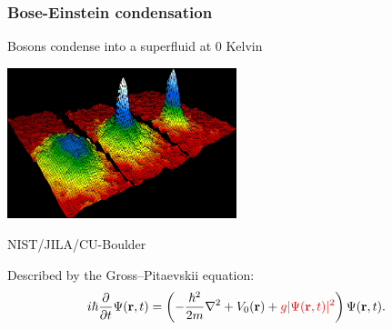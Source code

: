 \documentclass{beamer}
\begin{document}
\begin{frame}
\frametitle{Bose-Einstein condensation}
Bosons condense into a superfluid at 0 Kelvin

\begin{center}
\includegraphics[width=0.5\textwidth]{Bose_Einstein_condensate.png}

\tiny{NIST/JILA/CU-Boulder}
\end{center}

\pause

Described by the Gross--Pitaevskii equation:
\begin{equation*}
    i\hbar \frac{\partial}{\partial t}\Psi(\mathbf{r},t) = \left( - \frac{\hbar^2}{2m} \nabla^2 + V_0(\mathbf{r}) + {\color{red}{g |\Psi(\mathbf{r},t)|^2}}\right)\Psi(\mathbf{r},t).
\end{equation*}


\end{frame}
\end{document}

